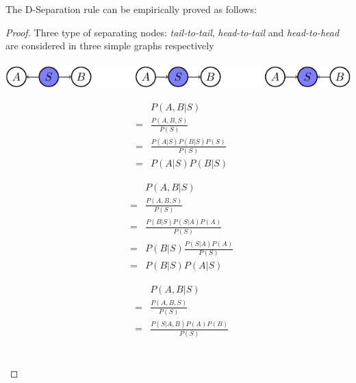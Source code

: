 The D-Separation rule can be empirically proved as follows:
\begin{proof}
	Three type of separating nodes: \emph{tail-to-tail}, \emph{head-to-tail} and \emph{head-to-head} are considered in three simple graphs respectively   \\ \\
	\includegraphics[width=\textwidth]{./Figures/D_Sep}\newline
\begin{minipage}[c]{0.32\textwidth}
 \begin{equation*}
  \begin{array}{rcl}
   & & P(A,B|S)\\
   &=& \frac{P(A,B,S)}{P(S)}\\
   &=& \frac{P(A|S)P(B|S)P(S)}{P(S)}\\
   &=& P(A|S)P(B|S)
  \end{array}
 \end{equation*}
\end{minipage}
\begin{minipage}[c]{0.32\textwidth}
 \begin{equation*}
  \begin{array}{rcl}
   & & P(A,B|S)\\
   &=& \frac{P(A,B,S)}{P(S)}\\
   &=& \frac{P(B|S)P(S|A)P(A)}{P(S)}\\
   &=& P(B|S)\frac{P(S|A)P(A)}{P(S)}\\
   &=& P(B|S)P(A|S)
  \end{array}
 \end{equation*}
\end{minipage}
\begin{minipage}[c]{0.32\textwidth}
 \begin{equation*}
  \begin{array}{rcl}
   & & P(A,B|S)\\
   &=& \frac{P(A,B,S)}{P(S)}\\
   &=& \frac{P(S|A,B)P(A)P(B)}{P(S)}\\
  \end{array}
 \end{equation*}
\end{minipage}\\
\end{proof}



